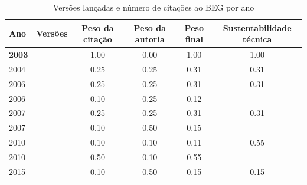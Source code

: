 \begin{table}[H]
\caption{Versões lançadas e número de citações ao BEG por ano}
\centering
\begin{tabular}{| l | c | c | c | c | c |}
  \hline
  Ano & Versões & Peso da citação & Peso da autoria & Peso final & Sustentabilidade técnica \\
  \hline
            {\bf 2003}
          &
          
          &
          1.00
          &
          0.00
          &
          1.00
          &
            {\color{blue} 1.00}
          \\
\hline
            2004
          &
          
          &
          0.25
          &
          0.25
          &
          0.31
          &
            {\color{red} 0.31}
          \\
\hline
            2006
          &
          
          &
          0.25
          &
          0.25
          &
          0.31
          &
            {\color{red} 0.31}
          \\
            2006
          &
          
          &
          0.10
          &
          0.25
          &
          0.12
          &
          \\
\hline
            2007
          &
          
          &
          0.25
          &
          0.25
          &
          0.31
          &
            {\color{red} 0.31}
          \\
            2007
          &
          
          &
          0.10
          &
          0.50
          &
          0.15
          &
          \\
\hline
            2010
          &
          
          &
          0.10
          &
          0.10
          &
          0.11
          &
            {\color{blue} 0.55}
          \\
            2010
          &
          
          &
          0.50
          &
          0.10
          &
          0.55
          &
          \\
\hline
            2015
          &
          
          &
          0.10
          &
          0.50
          &
          0.15
          &
            {\color{red} 0.15}
          \\
\hline
\end{tabular}
\end{table}

